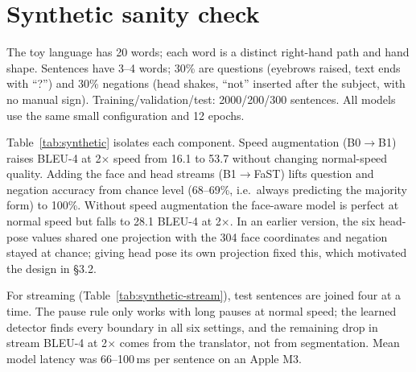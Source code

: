\documentclass[11pt]{article}
\begin{document}


\appendix
\section{Synthetic sanity check}\label{app:synthetic}
The toy language has 20 words; each word is a distinct right-hand path and hand shape. Sentences have
3--4 words; 30\% are questions (eyebrows raised, text ends with ``?'') and 30\% negations (head shakes,
``not'' inserted after the subject, with no manual sign). Training/validation/test: 2000/200/300
sentences. All models use the same small configuration and 12 epochs.



Table~\ref{tab:synthetic} isolates each component. Speed augmentation (B0$\to$B1) raises BLEU-4 at
2$\times$ speed from 16.1 to 53.7 without changing normal-speed quality. Adding the face and head
streams (B1$\to$FaST) lifts question and negation accuracy from chance level (68--69\%, i.e.\ always
predicting the majority form) to 100\%. Without speed augmentation the face-aware model is perfect at
normal speed but falls to 28.1 BLEU-4 at 2$\times$. In an earlier version, the six head-pose values
shared one projection with the 304 face coordinates and negation stayed at chance; giving head pose its
own projection fixed this, which motivated the design in \S3.2.

For streaming (Table~\ref{tab:synthetic-stream}), test sentences are joined four at a time. The pause
rule only works with long pauses at normal speed; the learned detector finds every boundary in all six
settings, and the remaining drop in stream BLEU-4 at 2$\times$ comes from the translator, not from
segmentation. Mean model latency was 66--100\,ms per sentence on an Apple M3.


\end{document}
